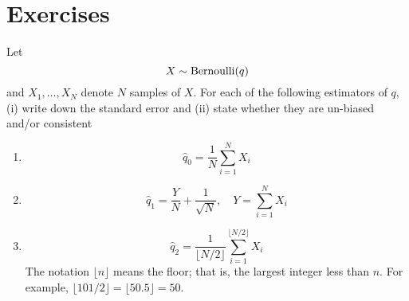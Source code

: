 \section*{Exercises}
\begin{exercise}\label{ex:1}
Let
\begin{equation*}
X \sim {\rm Bernoulli}(q)
\end{equation*}
and $X_1,\dots,X_N$ denote $N$ samples of $X$. 
For each of the following estimators of $q$, (i) write down the standard error and (ii) state whether they are un-biased and/or consistent 
\begin{enumerate}[label=(\alph*)]
\item 
\begin{equation*}
\hat{q}_{0} = \frac{1}{N}\sum_{i=1}^NX_i
\end{equation*}
\item 
\begin{equation*}
\hat{q}_{1} = \frac{Y}{N} + \frac{1}{\sqrt{N}},\quad Y = \sum_{i=1}^NX_i
\end{equation*}
\item 
\begin{equation*}
\hat{q}_{2} = \frac{1}{\lfloor N/2 \rfloor}\sum_{i=1}^{\lfloor N/2 \rfloor}X_i
\end{equation*}
The notation $\lfloor  n \rfloor$ means the floor; that is, the largest integer less than $n$. For example, $\lfloor 101/2 \rfloor = \lfloor 50.5 \rfloor = 50$. 
\end{enumerate}

\end{exercise}





